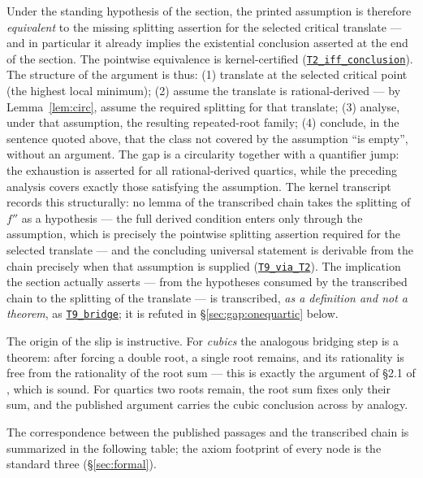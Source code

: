 \documentclass[11pt]{amsart}
\newcommand{\repourl}{https://github.com/hirokifukui/rd-quartics-classification}
\newcommand{\repotag}{v1.1.0}
\newcommand{\leanline}[3]{\href{\repourl/blob/\repotag/#1\#L#2}{\texttt{#3}}}
\begin{document}
Under the standing hypothesis of the section, the printed assumption is
therefore \emph{equivalent} to the missing splitting assertion for the
selected critical translate --- and in particular it already implies
the existential conclusion asserted at the end of the section.  The
pointwise equivalence is kernel-certified
(\leanline{Gap/BMThm7Transcript.lean}{106}{T2\_iff\_conclusion}).  The
structure of the argument is thus: (1) translate at the selected
critical point (the highest local minimum); (2) assume the translate is
rational-derived --- by Lemma~\ref{lem:circ}, assume the required
splitting for that translate; (3) analyse, under that assumption, the
resulting repeated-root family; (4) conclude, in the sentence quoted
above, that the class not covered by the assumption ``is empty'',
without an argument.  The gap is a circularity together with a
quantifier jump: the exhaustion is asserted for all rational-derived
quartics, while the preceding analysis covers exactly those satisfying
the assumption.  The kernel transcript records this structurally: no
lemma of the transcribed chain takes the splitting of $f''$ as a
hypothesis --- the full derived condition enters only through the
assumption, which is precisely the pointwise splitting assertion
required for the selected translate --- and the concluding universal
statement is derivable from the chain precisely when that assumption is
supplied (\leanline{Gap/BMThm7Transcript.lean}{316}{T9\_via\_T2}).  The
implication the section actually asserts --- from the hypotheses
consumed by the transcribed chain to the splitting of the translate ---
is transcribed, \emph{as a definition and not a theorem}, as
\leanline{Gap/BMThm7Transcript.lean}{308}{T9\_bridge}; it is refuted in
\S\ref{sec:gap:onequartic} below.

The origin of the slip is instructive.  For \emph{cubics} the analogous
bridging step is a theorem: after forcing a double root, a single root
remains, and its rationality is free from the rationality of the root
sum --- this is exactly the argument of \S2.1 of \cite{BM2000}, which
is sound.  For quartics two roots remain, the root sum fixes only their
sum, and the published argument carries the cubic conclusion across by
analogy.

The correspondence between the published passages and the transcribed
chain is summarized in the following table; the axiom footprint of
every node is the standard three (\S\ref{sec:formal}).
\end{document}
